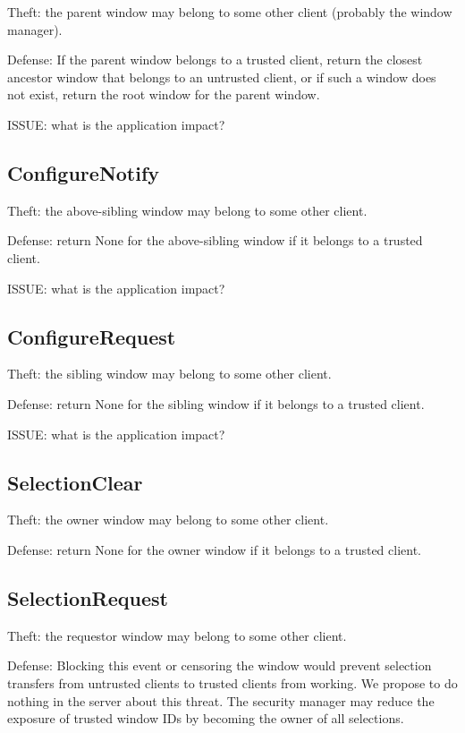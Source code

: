 \documentclass{article}
\begin{document}
Theft: the parent window may belong to some other client (probably
the window manager).

Defense: If the parent window belongs to a trusted client, return the
closest ancestor window that belongs to an untrusted client, or if
such a window does not exist, return the root window for the parent
window.

ISSUE: what is the application impact?


\subsection{ConfigureNotify}

Theft: the above-sibling window may belong to some other client.

Defense: return None for the above-sibling window if it belongs to a
trusted client.

ISSUE: what is the application impact?


\subsection{ConfigureRequest}

Theft: the sibling window may belong to some other client.

Defense: return None for the sibling window if it belongs to a trusted
client.

ISSUE: what is the application impact?


\subsection{SelectionClear}

Theft: the owner window may belong to some other client.

Defense: return None for the owner window if it belongs to a trusted
client.



\subsection{SelectionRequest}

Theft: the requestor window may belong to some other client.

Defense: Blocking this event or censoring the window would prevent
selection transfers from untrusted clients to trusted clients from
working.  We propose to do nothing in the server about this threat.
The security manager may reduce the exposure of trusted window IDs
by becoming the owner of all selections.
\end{document}
